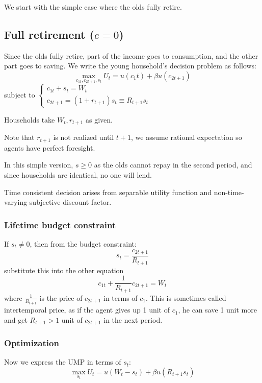 \documentclass[twocolumn, fleqn]{article}
\begin{document}
		We start with the simple case where the olds fully retire.

		\subsection{Full retirement ($e=0$)}\label{subsec:full-retirement}
			Since the olds fully retire, part of the income goes to consumption, and the other part goes to saving.
			We write the young household's decision problem as follows:
			\begin{equation}
				\max_{c_{1t}, c_{2t+1},s_t} U_t=u(c_1t)+\beta u(c_{2t+1})\label{eq:UMP}
			\end{equation}
			subject to
			\(
			\begin{cases}
				c_{1t}+s_{t} = W_t\\
				c_{2t+1} = (1+r_{t+1})s_t \equiv R_{t+1}s_t
			\end{cases}\)

			Households take $W_t, r_{t+1}$ as given.

			Note that $r_{t+1}$ is not realized until $t+1$, we assume rational expectation so agents have perfect
			foresight.

			In this simple version, $s\geq 0$ as the olds cannot repay in the second period, and since households
			are identical, no one will lend.

			\begin{note}
				Time consistent decision arises from separable utility function and non-time-varying subjective
				discount factor.
			\end{note}

			\subsubsection{Lifetime budget constraint}
				If $s_t \neq 0$, then from the budget constraint:
				\[s_t = \frac{c_{2t+1}}{R_{t+1}}\]
				substitute this into the other equation
				\[c_{1t}+\frac{1}{R_{t+1}}c_{2t+1}=W_t\]
				where $\frac{1}{R_{t+1}}$ is the price of $c_{2t+1}$ in terms of $c_1$.
				This is sometimes called intertemporal price, as if the agent gives up 1 unit of $c_1$, he can save
				1 unit more and get $R_{t+1}>1$ unit of $c_{2t+1}$ in the next period.

			\subsubsection{Optimization}
				Now we express the UMP in terms of $s_t$:
				\begin{equation}
					\max_{s_t} U_t=u(W_t - s_t)+\beta u(R_{t+1}s_t) \label{eq:UMP_S}
				\end{equation}
\end{document}

